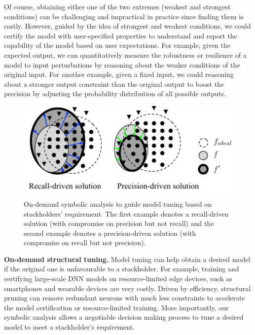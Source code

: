 Of course, obtaining either one of the two extremes (weakest and strongest conditions) can be challenging and impractical in practice since finding them is costly. However, guided by the idea of strongest and weakest conditions, we could certify the model with user-specified properties to understand and report the capability of the model based on user expectations. 
For example, given the expected output, we can quantitatively measure the robustness or resilience of a model to input perturbations by reasoning about the weaker conditions of the original input. For another example, given a fixed input, we could reasoning about a stronger output constraint than the original output to boost the precision by adjusting the  probability distribution of all possible outputs.



\begin{figure}
    \includegraphics[scale=1]{fig/certify.pdf}
     \caption{\footnotesize On-demand symbolic analysis to guide model tuning based on stackholders' requirement. The first example denotes a recall-driven solution (with compromise on precision but not recall) and the second example denotes a precision-driven solution (with compromise on recall but not precision).}
    \label{fig:certify}
\end{figure}

\textbf{On-demand structural tuning.}
Model tuning can help obtain a desired model if the original one is unfavourable to a stackholder. 
For example, training and certifying large-scale DNN models on resource-limited edge devices, such as smartphones and wearable devices are very costly. Driven by efficiency, structural pruning can remove redundant neurons with much less constraints to accelerate the model certification or resource-limited training. More importantly, our symbolic analysis allows a negotiable decision making process to tune a desired model to meet a stackholder's requirement.

